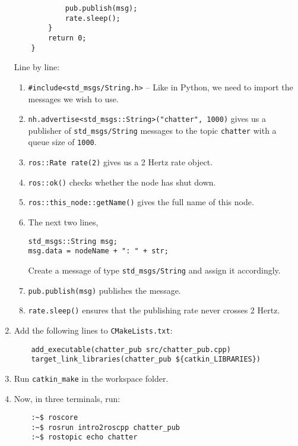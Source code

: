 \documentclass{article}
\begin{document}
\begin{enumerate}
\begin{verbatim}
            pub.publish(msg);
            rate.sleep();
        }
        return 0;   
    }
            \end{verbatim}
            Line by line:
            \begin{enumerate}
                \item \texttt{#include<std_msgs/String.h>} -- Like in Python, we need to import 
                the messages we wish to use.
                \item \texttt{nh.advertise<std_msgs::String>("chatter", 1000)} gives us a publisher
                of \texttt{std\_msgs/String} messages to the topic \texttt{chatter} with a queue size of \texttt{1000}.
                \item \texttt{ros::Rate rate(2)} gives us a 2 Hertz rate object.
                \item \texttt{ros::ok()} checks whether the node has shut down.
                \item \texttt{ros::this_node::getName()} gives the full name of this node.
                \item The next two lines,
                \begin{verbatim}
std_msgs::String msg;
msg.data = nodeName + ": " + str;
                \end{verbatim}
                Create a message of type \texttt{std\_msgs/String} and assign it accordingly.
                \item \texttt{pub.publish(msg)} publishes the message.
                \item \texttt{rate.sleep()} ensures that the publishing rate never crosses 2 Hertz.
            \end{enumerate}
            \item Add the following lines to \texttt{CMakeLists.txt}:
            \begin{verbatim}
    add_executable(chatter_pub src/chatter_pub.cpp)
    target_link_libraries(chatter_pub ${catkin_LIBRARIES})
            \end{verbatim}
            \item Run \texttt{catkin\_make} in the workspace folder.
            \item Now, in three terminals, run:
            \begin{verbatim}
    :~$ roscore
    :~$ rosrun intro2roscpp chatter_pub
    :~$ rostopic echo chatter 
            \end{verbatim}

\end{enumerate}
\end{document}
